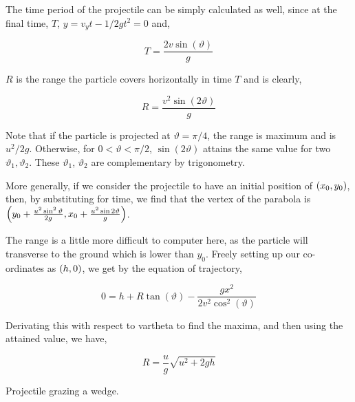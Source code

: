 The time period of the projectile can be simply calculated as well,
since at the final time, \(T\), \(y = v_yt - 1/2gt^2 = 0\) and,

\begin{equation}
    T = \frac{2v\sin(\vartheta)}{g}
\end{equation}

\(R\) is the range the particle covers horizontally in time \(T\) and is
clearly,

\begin{equation}
    R = \frac{v^2\sin(2\vartheta)}{g}
\end{equation}

Note that if the particle is projected at \(\vartheta = \pi/4\), 
the range is maximum and is \(u^2/2g\). Otherwise,
for \(0 < \vartheta < \pi/2\), \(\sin(2\vartheta)\) attains the same 
value for two \(\vartheta_1, \vartheta_2\). These \(\vartheta_1\), \(\vartheta_2\) are complementary
by trigonometry.

More generally, if we consider the projectile to have an initial position of 
\(\qty(x_0, y_0)\), then, by substituting for time, we find that the 
vertex of the parabola is \(\qty(y_0 + \frac{u^2\sin^2\vartheta}{2g}, x_0 + \frac{u^2\sin2\vartheta}{g})\).

The range is a little more difficult to computer here, as the particle will transverse to 
the ground which is lower than \(y_0\). Freely setting up our co-ordinates 
as \(\qty(h, 0)\), we get by the equation of trajectory,

\[
    0 = h + R\tan(\vartheta) - \frac{gx^2}{2v^2\cos^2(\vartheta)}
\]

Derivating this with respect to vartheta to find the maxima, and then using the attained
value, we have, 

\begin{equation}
    R = \frac{u}{g}\sqrt{u^2 + 2gh}
\end{equation}

\begin{marginfigure}
    \hspace{-2em}
    \caption{Projectile grazing a wedge.}
\end{marginfigure}

